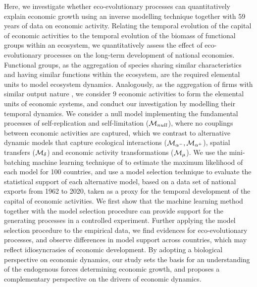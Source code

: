   Here, we investigate whether eco-evolutionary processes can quantitatively explain economic growth using an inverse modelling technique together with 59 years of data on economic activity. Relating the temporal evolution of the capital of economic activities to the temporal evolution of the biomass of functional groups within an ecosystem, we quantitatively assess the effect of eco-evolutionary processes on the long-term development of national economies.
  Functional groups, as the aggregation of species sharing similar characteristics and having similar functions within the ecosystem, are the required elemental units to model ecosystem dynamics. Analogously, as the aggregation of firms with similar output nature \cite{Applegate2021}, we consider 9 economic activities to form the elemental units of economic systems, and  conduct our investigation by modelling their temporal dynamics.
  We consider a null model implementing the fundamental processes of self-replication and self-limitation ($\mathcal{M}_{null}$), where no couplings between economic activities are captured, which we contrast to alternative  dynamic models that capture ecological interactions ($\mathcal{M}_{\alpha^-},\mathcal{M}_{\alpha^+}$), spatial transfers ($\mathcal{M}_\delta$) and economic activity transformations ($\mathcal{M}_\mu$).
  We use the mini-batching machine learning technique of \cite{Boussange2022a} to estimate the maximum likelihood of each model for 100 countries, and use a model selection technique to evaluate the statistical support of each alternative model, based on a data set of national exports from 1962 to 2020, taken as a proxy for the temporal development of the capital of economic activities. 
  We first show that the machine learning method together with the model selection procedure can provide support for the generating processes in a controlled experiment.
  Further applying the model selection procedure to the empirical data, we find evidences for eco-evolutionary processes, and observe differences in model support across countries, which may reflect idiosyncrasies of economic development. 
  By adopting a biological perspective on economic dynamics, our study sets the basis for an understanding of the endogenous forces determining economic growth, and proposes a complementary perspective on the drivers of economic dynamics.
\begin{comment}
    As in previous work \cite{Michalakelis2011}, 
    \cite{Brummitt2020}: analysis of time series to understand patterns of growth. For sure to be cited. Our work goes in this direction, and further provides other distinction, i.e. evolution is a distinguishable factor.
\end{comment}


